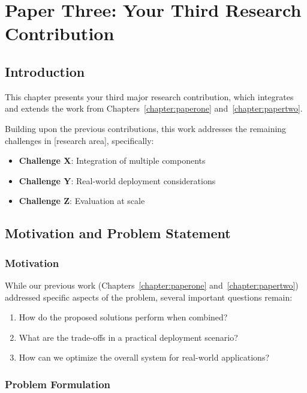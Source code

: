 \chapter{Paper Three: Your Third Research Contribution}
\label{chapter:paperthree}

\section{Introduction}

This chapter presents your third major research contribution, which integrates and extends the work from Chapters~\ref{chapter:paperone} and~\ref{chapter:papertwo}. \lipsum[1-2]

Building upon the previous contributions, this work addresses the remaining challenges in [research area], specifically:
\begin{itemize}
    \item \textbf{Challenge X}: Integration of multiple components
    \item \textbf{Challenge Y}: Real-world deployment considerations
    \item \textbf{Challenge Z}: Evaluation at scale
\end{itemize}

\section{Motivation and Problem Statement}

\subsection{Motivation}

While our previous work (Chapters~\ref{chapter:paperone} and~\ref{chapter:papertwo}) addressed specific aspects of the problem, several important questions remain:
\begin{enumerate}
    \item How do the proposed solutions perform when combined?
    \item What are the trade-offs in a practical deployment scenario?
    \item How can we optimize the overall system for real-world applications?
\end{enumerate}

\subsection{Problem Formulation}

